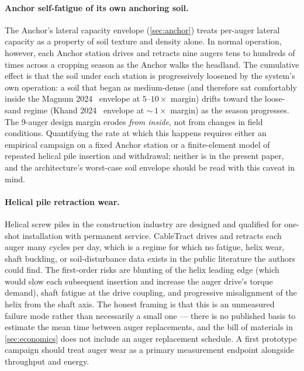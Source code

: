 \documentclass[11pt,a4paper]{article}
\begin{document}
\paragraph{Anchor self-fatigue of its own anchoring soil.} The Anchor's lateral capacity envelope (\cref{sec:anchor}) treats per-auger lateral capacity as a property of soil texture and density alone. In normal operation, however, each Anchor station drives and retracts nine augers tens to hundreds of times across a cropping season as the Anchor walks the headland. The cumulative effect is that the soil under each station is progressively loosened by the system's own operation: a soil that began as medium-dense (and therefore sat comfortably inside the Magnum 2024~\cite{magnum2024fixed} envelope at $5$--$10\times$ margin) drifts toward the loose-sand regime (Khand 2024~\cite{khand2024helical} envelope at ${\sim}\,1\times$ margin) as the season progresses. The 9-auger design margin erodes \emph{from inside}, not from changes in field conditions. Quantifying the rate at which this happens requires either an empirical campaign on a fixed Anchor station or a finite-element model of repeated helical pile insertion and withdrawal; neither is in the present paper, and the architecture's worst-case soil envelope should be read with this caveat in mind.

\paragraph{Helical pile retraction wear.} Helical screw piles in the construction industry are designed and qualified for one-shot installation with permanent service. CableTract drives and retracts each auger many cycles per day, which is a regime for which no fatigue, helix wear, shaft buckling, or soil-disturbance data exists in the public literature the authors could find. The first-order risks are blunting of the helix leading edge (which would slow each subsequent insertion and increase the auger drive's torque demand), shaft fatigue at the drive coupling, and progressive misalignment of the helix from the shaft axis. The honest framing is that this is an unmeasured failure mode rather than necessarily a small one --- there is no published basis to estimate the mean time between auger replacements, and the bill of materials in \cref{sec:economics} does not include an auger replacement schedule. A first prototype campaign should treat auger wear as a primary measurement endpoint alongside throughput and energy.
\end{document}
